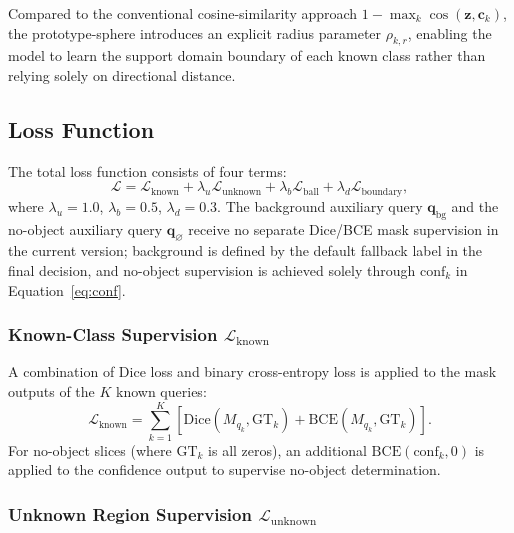 \documentclass[3p,twocolumn,authoryear]{elsarticle}
\newcommand{\bq}{\mathbf{q}}                              %
\newcommand{\bz}{\mathbf{z}}                              %
\begin{document}
Compared to the conventional cosine-similarity approach
$1 - \max_k \cos(\bz, \mathbf{c}_k)$, the prototype-sphere introduces an explicit
radius parameter $\rho_{k,r}$, enabling the model to learn the support domain boundary
of each known class rather than relying solely on directional distance.

\subsection{Loss Function}\label{sec:method:loss}

The total loss function consists of four terms:
\begin{equation}\label{eq:total_loss}
  \mathcal{L} = \mathcal{L}_{\text{known}} + \lambda_u \mathcal{L}_{\text{unknown}} + \lambda_b \mathcal{L}_{\text{ball}} + \lambda_d \mathcal{L}_{\text{boundary}},
\end{equation}
where $\lambda_u = 1.0$, $\lambda_b = 0.5$, $\lambda_d = 0.3$.
The background auxiliary query $\bq_{\text{bg}}$ and the no-object auxiliary query
$\bq_{\varnothing}$ receive no separate Dice/BCE mask supervision in the current
version; background is defined by the default fallback label in the final decision,
and no-object supervision is achieved solely through $\text{conf}_k$ in
Equation~\eqref{eq:conf}.

\subsubsection{Known-Class Supervision $\mathcal{L}_{\text{known}}$}\label{sec:method:loss:known}

A combination of Dice loss and binary cross-entropy loss is applied to the mask
outputs of the $K$ known queries:
\begin{equation}\label{eq:loss_known}
  \mathcal{L}_{\text{known}} = \sum_{k=1}^{K} \left[\text{Dice}(M_{q_k}, \text{GT}_k) + \text{BCE}(M_{q_k}, \text{GT}_k)\right].
\end{equation}
For no-object slices (where $\text{GT}_k$ is all zeros), an additional
$\text{BCE}(\text{conf}_k, 0)$ is applied to the confidence output to supervise
no-object determination.

\subsubsection{Unknown Region Supervision $\mathcal{L}_{\text{unknown}}$}\label{sec:method:loss:unknown}
\end{document}
